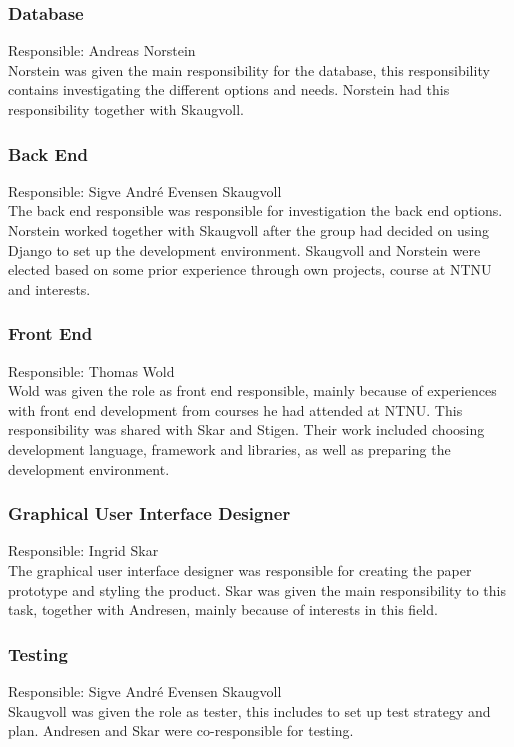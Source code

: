 \subsubsection{Database}
Responsible: Andreas Norstein\\
Norstein was given the main responsibility for the database, this responsibility contains investigating the different options and needs. Norstein had this responsibility together with Skaugvoll.

\subsubsection{Back End}
Responsible: Sigve André Evensen Skaugvoll\\
The back end responsible was responsible for investigation the back end options. Norstein worked together with Skaugvoll after the group had decided on using Django to set up the development environment. Skaugvoll and Norstein were elected based on some prior experience through own projects, course at NTNU and interests.

\subsubsection{Front End}
Responsible: Thomas Wold\\
Wold was given the role as front end responsible, mainly because of experiences with front end development from courses he had attended at NTNU. This responsibility was shared with Skar and Stigen. Their work included choosing development language, framework and libraries, as well as preparing the development environment.

\subsubsection{Graphical User Interface Designer}
Responsible: Ingrid Skar\\
The graphical user interface designer was responsible for creating the paper prototype and styling the product. Skar was given the main responsibility to this task, together with Andresen, mainly because of interests in this field.

\subsubsection{Testing}
Responsible: Sigve André Evensen Skaugvoll\\
Skaugvoll was given the role as tester, this includes to set up test strategy and plan. Andresen and Skar were co-responsible for testing. 

